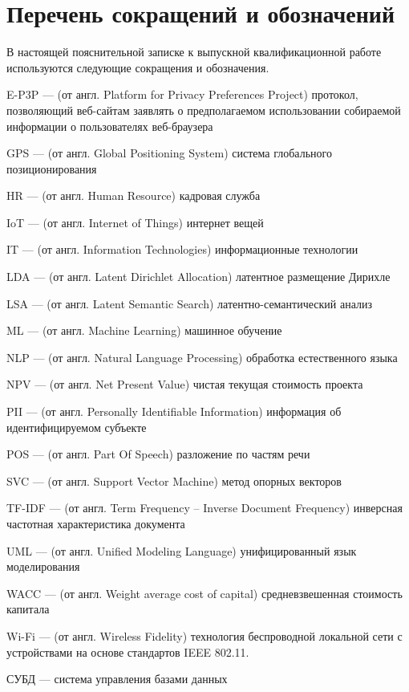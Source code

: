 \documentclass[../main]{subfiles}
\begin{document}
\newpage
{}
{}
\section*{Перечень сокращений и обозначений}

В настоящей пояснительной записке к выпускной квалификационной
работе используются следующие сокращения и обозначения.

\begin{termenum}
    \item E-P3P --- (от англ. Platform for Privacy Preferences Project) протокол, позволяющий веб-сайтам заявлять о предполагаемом использовании собираемой информации о пользователях веб-браузера
    \item GPS --- (от англ. Global Positioning System) система глобального позиционирования
    \item HR --- (от англ. Human Resource) кадровая служба
    \item IoT --- (от англ. Internet of Things) интернет вещей
    \item IT --- (от англ. Information Technologies) информационные технологии
    \item LDA --- (от англ. Latent Dirichlet Allocation) латентное размещение Дирихле
    \item LSA --- (от англ. Latent Semantic Search) латентно-семантический анализ
    \item ML --- (от англ. Machine Learning) машинное обучение
    \item NLP --- (от англ. Natural Language Processing) обработка естественного языка
    \item NPV --- (от англ. Net Present Value) чистая текущая стоимость проекта
    \item PII --- (от англ. Personally Identifiable Information) информация об идентифицируемом субъекте
    \item POS --- (от англ. Part Of Speech) разложение по частям речи
    \item SVC --- (от англ. Support Vector Machine) метод опорных векторов
    \item TF-IDF --- (от англ. Term Frequency -- Inverse Document Frequency) инверсная частотная характеристика документа
    \item UML --- (от англ. Unified Modeling Language) унифицированный язык моделирования
    \item WACC --- (от англ. Weight average cost of capital) средневзвешенная стоимость капитала
    \item Wi-Fi --- (от англ. Wireless Fidelity) технология беспроводной локальной сети с устройствами на основе стандартов IEEE 802.11.
    \item СУБД --- система управления базами данных
\end{termenum}
\end{document}
